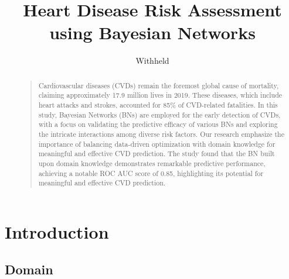 \documentclass[letterpaper]{article}
\begin{document}
%
\title{Heart Disease Risk Assessment using Bayesian Networks}
\author{Withheld}

\maketitle



\begin{abstract}
\begin{quote}


Cardiovascular diseases (CVDs) remain the foremost global cause of mortality, claiming approximately 17.9 million lives in 2019. These diseases, which include heart attacks and strokes, accounted for 85\% of CVD-related fatalities. 
In this study, Bayesian Networks (BNs) are employed for the early detection of CVDs, with a focus on validating the predictive efficacy of various BNs and exploring the intricate interactions among diverse risk factors. Our research emphasize the importance of balancing data-driven optimization with domain knowledge for meaningful and effective CVD prediction. The study found that the BN built upon domain knowledge demonstrates remarkable predictive performance, achieving a notable ROC AUC score of 0.85, highlighting its potential for meaningful and effective CVD prediction.
\end{quote}
\end{abstract}

\section{Introduction}
\subsection{Domain}
\end{document}
